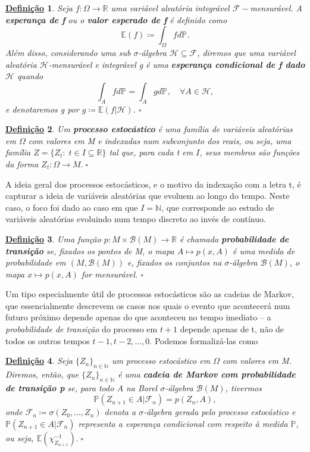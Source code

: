 \documentclass[12pt]{article}
\newtheorem*{def*}{\underline{Definição}}
\theoremstyle{definition}
\begin{document}
\begin{def*}
	Seja \(f:\Omega \rightarrow \mathbb{R}\) uma variável aleatória integrável \(\mathcal{F}-\)mensurável. A \textbf{esperança de f} ou o \textbf{valor esperado de f} é definido como
	\[
		\mathbb{E}(f)\coloneqq \int_{\Omega }f d\mathbb{P}_{}.
	\]
	Além disso, considerando uma sub \(\sigma \)-álgebra \(\mathcal{H}\subseteq \mathcal{F}\), diremos que uma variável aleatória \(\mathcal{H}\)-mensurável e integrável g é uma \textbf{esperança condicional de f dado \(\mathcal{H}\)} quando
	\[
		\int_{A}f d\mathbb{P}_{} = \int_{A}g d\mathbb{P}_{},\quad \forall A\in \mathcal{H},
	\]
	e denotaremos g por \(g\coloneqq \mathbb{E}(f|\mathcal{H})\). \(\square\)
\end{def*}

\begin{def*}
	Um \textbf{processo estocástico} é uma família de variáveis aleatórias em \(\Omega \) com valores em M e indexadas num subconjunto dos reais, ou seja, uma família \(Z=\{Z_{t}:\; t\in I\subseteq \mathbb{R}\}\) tal que, para cada t em \(I\), seus membros são funções da forma \(	Z_t:\Omega \rightarrow M. \; \square\)
\end{def*}

A ideia geral dos processos estocásticos, e o motivo da indexação com a letra t, é capturar a ideia de variáveis aleatórias que evoluem ao longo do tempo. Neste caso, o foco foi dado ao caso em que \(I=\mathbb{N}\), que corresponde ao estudo de variáveis aleatórias evoluindo num tempo discreto ao invés de contínuo.

\begin{def*}
	Uma função \(p:M\times \mathcal{B}(M)\rightarrow \mathbb{R}\) é chamada \textbf{probabilidade de transição} se, fixados os pontos de M, o mapa \(A\mapsto p(x, A)\) é uma medida de probabilidade em \((M, \mathcal{B}(M))\) e, fixados os conjuntos na \(\sigma \)-álgebra \(\mathcal{B}(M)\), o mapa \(x\mapsto p(x, A)\) for mensurável. \(\square\)
\end{def*}

Um tipo especialmente útil de processos estocásticos são as cadeias de Markov, que essencialmente descrevem os casos nos quais o evento que acontecerá num futuro próximo depende apenas do que aconteceu no tempo imediato -- a \textit{probabilidade de transição} do processo em \(t+1\) depende apenas de t, não de todos os outros tempos \(t-1, t-2, \dotsc , 0\). Podemos formalizá-las como
\begin{def*}
	Seja \( \{Z_{n}\}_{n\in \mathbb{N}}\) um processo estocástico em \(\Omega \) com valores em M. Diremos, então, que \(\{Z_{n}\}_{n\in \mathbb{N}}\) é uma \textbf{cadeia de Markov com probabilidade de transição p} se, para todo \(A\) na Borel \(\sigma \)-álgebra \(\mathcal{B}(M)\), tivermos
	\[
		\mathbb{P}(Z_{n+1}\in A| \mathcal{F}_{n})=p(Z_{n}, A),
	\]
	onde \(\mathcal{F}_{n}\coloneqq \sigma (Z_{0}, \dotsc , Z_{n})\) denota a \(\sigma \)-álgebra gerada pelo processo estocástico e \(\mathbb{P}(Z_{n+1}\in A| \mathcal{F}_{n})\) representa a esperança condicional com respeito à medida \(\mathbb{P}\), ou seja, \(\mathbb{E}(\chi^{-1}_{Z_{n+1}}).\;\square\)
\end{def*}
\end{document}
